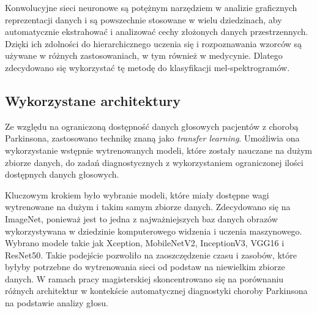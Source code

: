 Konwolucyjne sieci neuronowe są potężnym narzędziem w analizie graficznych reprezentacji danych i są powszechnie stosowane w wielu dziedzinach, aby automatycznie ekstrahować i analizować cechy złożonych danych przestrzennych.
Dzięki ich zdolności do hierarchicznego uczenia się i rozpoznawania wzorców są używane w różnych zastosowaniach, w tym również w medycynie.
Dlatego zdecydowano się wykorzystać tę metodę do klasyfikacji mel-spektrogramów.

\subsection{Wykorzystane architektury}
\label{subsec:architektury}

Ze względu na ograniczoną dostępność danych głosowych pacjentów z chorobą Parkinsona, zastosowano technikę znaną jako \emph{transfer learning}.
Umożliwia ona wykorzystanie wstępnie wytrenowanych modeli, które zostały nauczane na dużym zbiorze danych,
do zadań diagnostycznych z wykorzystaniem ograniczonej ilości dostępnych danych głosowych.

Kluczowym krokiem było wybranie modeli, które miały dostępne wagi wytrenowane na dużym i takim samym zbiorze danych.
Zdecydowano się na ImageNet, ponieważ jest to jedna z najważniejszych baz danych obrazów wykorzystywana w dziedzinie komputerowego widzenia i uczenia maszynowego.
Wybrano modele takie jak Xception, MobileNetV2, InceptionV3, VGG16 i ResNet50.
Takie podejście pozwoliło na zaoszczędzenie czasu i zasobów, które byłyby potrzebne do wytrenowania sieci od podstaw na niewielkim zbiorze danych.
W ramach pracy magisterskiej skoncentrowano się na porównaniu różnych architektur w kontekście automatycznej diagnostyki choroby Parkinsona na podstawie analizy głosu.

